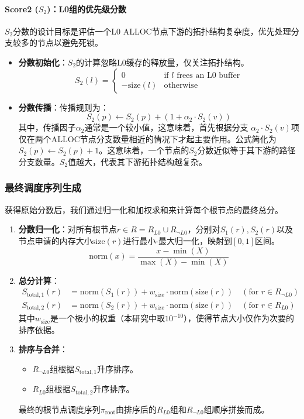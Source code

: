 \documentclass[11pt,a4paper]{article}
\begin{document}
\paragraph{Score2 ($S_2$)：L0组的优先级分数}
$S_2$分数的设计目标是评估一个L0 ALLOC节点下游的拓扑结构复杂度，优先处理分支较多的节点以避免死锁。
\begin{itemize}
    \item \textbf{分数初始化}：$S_2$的计算忽略L0缓存的释放量，仅关注拓扑结构。
    \[
    S_2(l) = \begin{cases} 
    0 & \text{if } l \text{ frees an L0 buffer} \\
    -\text{size}(l) & \text{otherwise}
    \end{cases}
    \]
    \item \textbf{分数传播}：传播规则为：
    \[
    S_2(p) \leftarrow S_2(p) + (1 + \alpha_2 \cdot S_2(v))
    \]
    其中，传播因子$\alpha_2$通常是一个较小值，这意味着，首先根据分支 $\alpha_2 \cdot S_2(v)$项仅在两个ALLOC节点分支数量相近的情况下才起主要作用。公式简化为$S_2(p) \leftarrow S_2(p) + 1$。这意味着，一个节点的$S_2$分数近似等于其下游的路径分支数量。$S_2$值越大，代表其下游拓扑结构越复杂。
\end{itemize}

\subsubsection{最终调度序列生成}
获得原始分数后，我们通过归一化和加权求和来计算每个根节点的最终总分。
\begin{enumerate}
    \item \textbf{分数归一化}：对所有根节点$r \in R = R_{L0} \cup R_{\neg L0}$，分别对$S_1(r), S_2(r)$以及节点申请的内存大小$\text{size}(r)$进行最小-最大归一化，映射到$[0, 1]$区间。
    \[
    \text{norm}(x) = \frac{x - \min(X)}{\max(X) - \min(X)}
    \]
    \item \textbf{总分计算}：
    \begin{align*}
    S_{\text{total},1}(r) &= \text{norm}(S_1(r)) + w_{\text{size}} \cdot \text{norm}(\text{size}(r)) \quad (\text{for } r \in R_{\neg L0}) \\
    S_{\text{total},2}(r) &= \text{norm}(S_2(r)) + w_{\text{size}} \cdot \text{norm}(\text{size}(r)) \quad (\text{for } r \in R_{L0})
    \end{align*}
    其中$w_{\text{size}}$是一个极小的权重（本研究中取$10^{-10}$），使得节点大小仅作为次要的排序依据。
    \item \textbf{排序与合并}：
    \begin{itemize}
        \item $R_{\neg L0}$组根据$S_{\text{total},1}$升序排序。
        \item $R_{L0}$组根据$S_{\text{total},2}$升序排序。
    \end{itemize}
    最终的根节点调度序列$\pi_{\text{root}}$由排序后的$R_{L0}$组和$R_{\neg L0}$组顺序拼接而成。
\end{enumerate}
\end{document}
